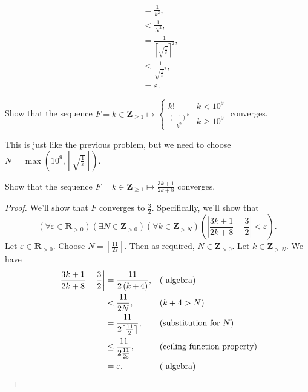 \documentclass[12pt, fleqn, answers]{exam}
\newcommand{\reals}{\mathbf{R}}
\newcommand{\integers}{\mathbf{Z}}
\begin{document}
\begin{questions}
\begin{solution}
\begin{align*}
                 &= \frac{1}{k^2}, \\
                 &< \frac{1}{N^2}, \\
                 &=  \frac{1}{\left \lceil \sqrt{\frac{1}{\varepsilon}} \right \rceil^2}, \\
                 &\leq \frac{1}{\sqrt{\frac{1}{\varepsilon}}^2}, \\
                 &= \varepsilon.
\end{align*}
\end{solution}
\question Show that the sequence $F = k \in \integers_{\geq 1} \mapsto \begin{cases} k! & k < 10^9 \\
\frac{(-1)^k}{k^2} & k \geq 10^9 \end{cases}$ converges.

\begin{solution} This is just like the previous problem, but we need to choose $N = \max(10^9,  \left \lceil \sqrt{\frac{1}{\varepsilon}} \right \rceil)$.

\end{solution}

\question Show that the sequence $F = k \in \integers_{\geq 1} \mapsto \frac{3 k+ 1}{2 k + 8}$ converges.

\begin{solution}
\begin{proof} We'll show that $F$ converges to $\frac{3}{2}$. Specifically,
  we'll show that 
  \begin{equation*}
    \left(\forall \varepsilon \in \reals_{> 0} \right)
    \left(\exists N \in \integers_{> 0} \right)
    \left(\forall k \in \integers_{> N} \right)
   \left( \left| \frac{ 3k+1}{2 k + 8} - \frac{3}{2} \right| < \varepsilon \right).
  \end{equation*}
Let $\varepsilon \in \reals_{> 0}$. Choose $N = \left \lceil \frac{11}{2 \varepsilon} \right \rceil$.
Then as required, $N \in \integers_{> 0}$. Let $k \in \integers_{>N}$. 
We have
\begin{align*}
 \left| \frac{ 3k+1}{2 k + 8} - \frac{3}{2} \right| &= \frac{11}{2 \left( k\operatorname{+}4\right) }, 
                &&\mbox{(\text{ algebra})}\\
                &< \frac{11}{2 N}, && (k + 4 > N) \\
                &=  \frac{11}{2 \lceil \frac{11}{2} \rceil}, && \mbox{(substitution for $N$)} \\
                &\leq \frac{11}{2 \frac{11}{2 \varepsilon}},  && \mbox{(ceiling function property)} \\
                &=  \varepsilon. &&\mbox{(\text{ algebra})} \qedhere
\end{align*}


\end{proof}
\end{solution}
\end{questions}
\end{document}
